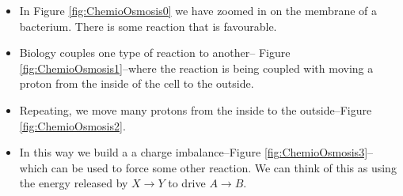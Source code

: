 \documentclass[]{article}
\begin{document}
\begin{itemize}
	\item In Figure \ref{fig:ChemioOsmosis0} we have zoomed in on the membrane of a bacterium. There is some reaction that is favourable.

	\item Biology couples one type of reaction to another-- Figure \ref{fig:ChemioOsmosis1}--where the reaction is being coupled with moving a proton from the inside of the cell to the outside.

	\item Repeating, we move many protons from the inside to the outside--Figure \ref{fig:ChemioOsmosis2}.
	
	\item In this way we build a a charge imbalance--Figure \ref{fig:ChemioOsmosis3}--which can be used to force some other reaction. We can think of this as using the energy released by $X\rightarrow Y$ to drive $A\rightarrow B$.

\end{itemize}
\end{document}
